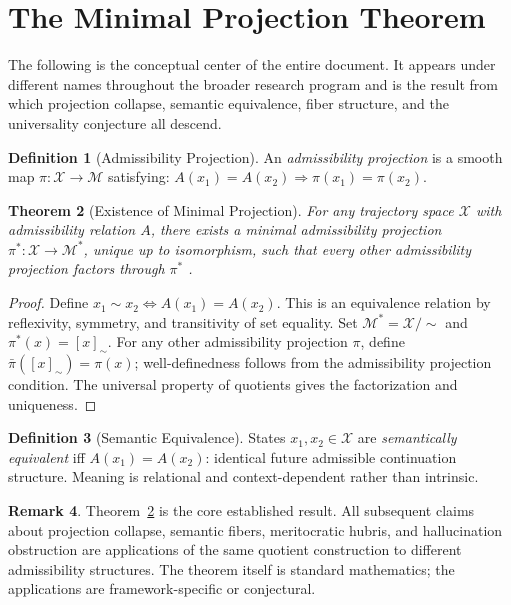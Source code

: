 \documentclass[12pt, a4paper]{article}
\theoremstyle{rsvpstyle}
\newtheorem{theorem}{Theorem}[section]
\theoremstyle{definition}
\newtheorem{definition}[theorem]{Definition}
\newtheorem{remark}[theorem]{Remark}
\newcommand{\Traj}{\mathcal{X}}
\newcommand{\OpMan}{\mathcal{M}}
\begin{document}
\section{The Minimal Projection Theorem}
\label{sec:minproj}

The following is the conceptual center of the entire document. It appears under
different names throughout the broader research program and is the result from
which projection collapse, semantic equivalence, fiber structure, and the
universality conjecture all descend.

\begin{definition}[Admissibility Projection]
An \emph{admissibility projection} is a smooth map $\pi : \Traj \to \OpMan$
satisfying: $A(x_1) = A(x_2) \Rightarrow \pi(x_1) = \pi(x_2)$.
\end{definition}

\begin{theorem}[Existence of Minimal Projection]
\label{thm:minproj}
For any trajectory space $\Traj$ with admissibility relation $A$, there
exists a minimal admissibility projection $\pi^* : \Traj \to \OpMan^*$,
unique up to isomorphism, such that every other admissibility projection
factors through $\pi^*$ \citep{Hatcher2002,MacLane1998}.
\end{theorem}

\begin{proof}
Define $x_1 \sim x_2 \Leftrightarrow A(x_1) = A(x_2)$. This is an equivalence
relation by reflexivity, symmetry, and transitivity of set equality. Set
$\OpMan^* = \Traj/{\sim}$ and $\pi^*(x) = [x]_\sim$. For any other
admissibility projection $\pi$, define $\bar\pi([x]_\sim) = \pi(x)$;
well-definedness follows from the admissibility projection condition. The
universal property of quotients gives the factorization and uniqueness.
\end{proof}

\begin{definition}[Semantic Equivalence]
States $x_1, x_2 \in \Traj$ are \emph{semantically equivalent} iff
$A(x_1) = A(x_2)$: identical future admissible continuation structure.
Meaning is relational and context-dependent rather than intrinsic.
\end{definition}

\begin{remark}
Theorem~\ref{thm:minproj} is the core established result. All subsequent
claims about projection collapse, semantic fibers, meritocratic hubris, and
hallucination obstruction are applications of the same quotient construction
to different admissibility structures. The theorem itself is standard
mathematics; the applications are framework-specific or conjectural.
\end{remark}
\end{document}
